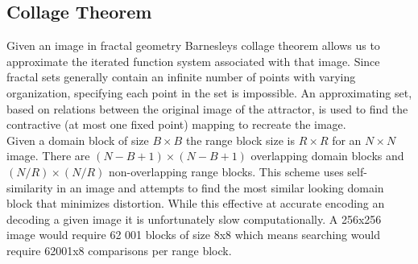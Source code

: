 \documentclass[12pt]{article}
\begin{document}
\subsection{Collage Theorem}
{\parindent0pt
Given an image in fractal geometry  Barnesleys collage theorem allows us to approximate the iterated function system associated with that image.\cite{iraq} Since fractal sets generally contain an infinite number of points with varying organization, specifying each point in the set is impossible. \cite{ifs}An approximating set, based on  relations between the original image of the attractor, is used to find the contractive (at most one fixed point) mapping to recreate the image. \\ 

Given a domain block of size $B \times B$ the range block size is $R \times R$ for an $N \times N$ image. There are $(N-B+1) \times (N-B+1)$ overlapping domain blocks and $(N/R) \times (N/R)$ non-overlapping range blocks.\cite{china} This scheme uses self-similarity in an image and attempts to find the most similar looking domain block that minimizes distortion. While this effective at accurate encoding an decoding a given image it is unfortunately slow computationally. A 256x256 image would require 62 001 blocks of size 8x8 which means searching would require 62001x8 comparisons per range block.
}
\end{document}
